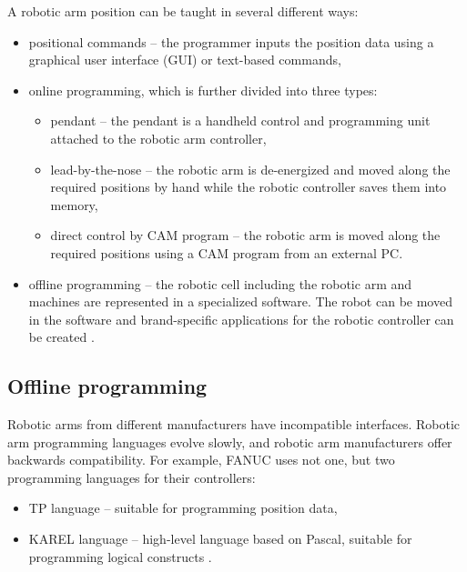 A robotic arm position can be taught in several different ways:

\begin{itemize}
    \item positional commands -- the programmer inputs the position data using a graphical user interface (GUI) or text-based commands,
    
    \item online programming, which is further divided into three types:
    
    \begin{itemize}
    
    \item pendant -- the pendant is a handheld control and programming unit attached to the robotic arm controller,
    \item lead-by-the-nose -- the robotic arm is de-energized and moved along the required positions by hand while the robotic controller saves them into memory,
    \item direct control by CAM program -- the robotic arm is moved along the required positions using a CAM program from an external PC.
    
    \end{itemize}
    
    \item offline programming -- the robotic cell including the robotic arm and machines are represented in a specialized software. The robot can be moved in the software and brand-specific applications for the robotic controller can be created \cite{robodkmethods}.
  

\end{itemize}

\subsection{Offline programming}
Robotic arms from different manufacturers have incompatible interfaces. Robotic arm programming languages evolve slowly, and robotic arm manufacturers offer backwards compatibility. For example, FANUC uses not one, but two programming languages for their controllers: 

\begin{itemize}

 \item TP language -- suitable for programming position data,
 \item KAREL language -- high-level language based on Pascal, suitable for programming logical constructs \cite{fanuchandling}.

\end{itemize}

